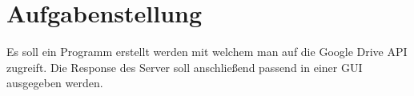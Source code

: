 
\section{Aufgabenstellung}
Es soll ein Programm erstellt werden mit welchem man auf die Google Drive API zugreift. Die Response des Server soll anschließend passend in einer GUI ausgegeben werden.